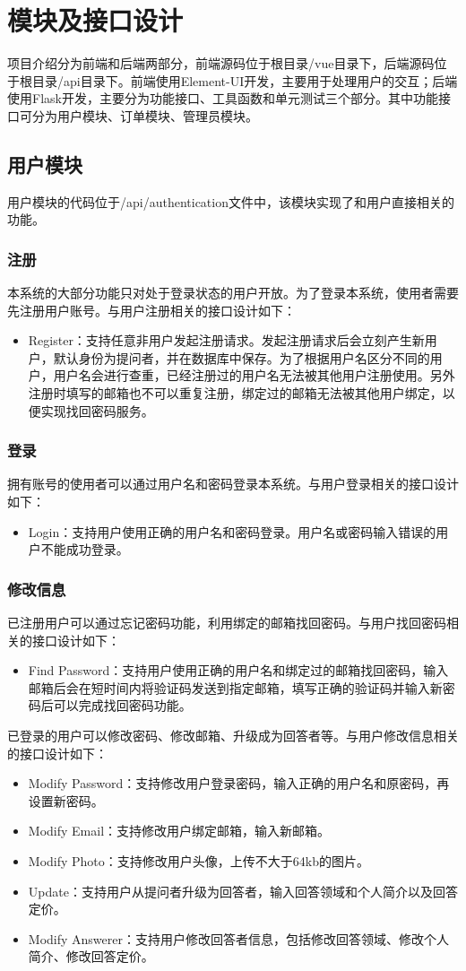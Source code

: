 \documentclass[12pt]{ctexart}
\begin{document}
\section{模块及接口设计}
项目介绍分为前端和后端两部分，前端源码位于根目录/vue目录下，后端源码位于根目录/api目录下。前端使用Element-UI开发，主要用于处理用户的交互；后端使用Flask开发，主要分为功能接口、工具函数和单元测试三个部分。其中功能接口可分为用户模块、订单模块、管理员模块。
\subsection{用户模块}
用户模块的代码位于/api/authentication文件中，该模块实现了和用户直接相关的功能。
\subsubsection{注册}
本系统的大部分功能只对处于登录状态的用户开放。为了登录本系统，使用者需要先注册用户账号。与用户注册相关的接口设计如下：
\begin{itemize}
	\item Register：支持任意非用户发起注册请求。发起注册请求后会立刻产生新用户，默认身份为提问者，并在数据库中保存。为了根据用户名区分不同的用户，用户名会进行查重，已经注册过的用户名无法被其他用户注册使用。另外注册时填写的邮箱也不可以重复注册，绑定过的邮箱无法被其他用户绑定，以便实现找回密码服务。
\end{itemize}
\subsubsection{登录}
拥有账号的使用者可以通过用户名和密码登录本系统。与用户登录相关的接口设计如下：
\begin{itemize}
	\item Login：支持用户使用正确的用户名和密码登录。用户名或密码输入错误的用户不能成功登录。
\end{itemize}
\subsubsection{修改信息}
已注册用户可以通过忘记密码功能，利用绑定的邮箱找回密码。与用户找回密码相关的接口设计如下：
\begin{itemize}
	\item Find Password：支持用户使用正确的用户名和绑定过的邮箱找回密码，输入邮箱后会在短时间内将验证码发送到指定邮箱，填写正确的验证码并输入新密码后可以完成找回密码功能。
\end{itemize}
已登录的用户可以修改密码、修改邮箱、升级成为回答者等。与用户修改信息相关的接口设计如下：
\begin{itemize}
	\item Modify Password：支持修改用户登录密码，输入正确的用户名和原密码，再设置新密码。
	\item Modify Email：支持修改用户绑定邮箱，输入新邮箱。
	\item Modify Photo：支持修改用户头像，上传不大于64kb的图片。
	\item Update：支持用户从提问者升级为回答者，输入回答领域和个人简介以及回答定价。
	\item Modify Answerer：支持用户修改回答者信息，包括修改回答领域、修改个人简介、修改回答定价。
\end{itemize}
\end{document}
